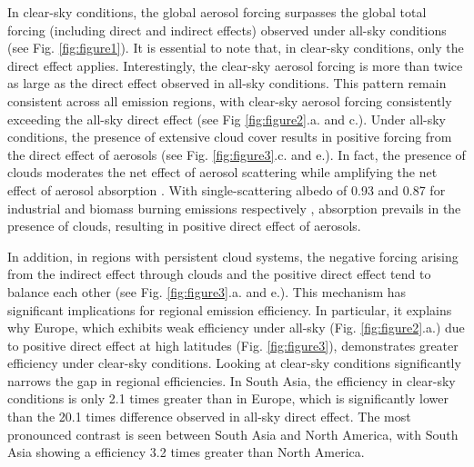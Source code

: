 \documentclass[draft]{agujournal2019}
\begin{document}
            In clear-sky conditions, the global aerosol forcing surpasses the global total forcing (including direct and indirect effects) observed under all-sky conditions (see Fig. \ref{fig:figure1}). It is essential to note that, in clear-sky conditions, only the direct effect applies. Interestingly, the clear-sky aerosol forcing is more than twice as large as the direct effect observed in all-sky conditions. This pattern remain consistent across all emission regions, with clear-sky aerosol forcing consistently exceeding the all-sky direct effect (see Fig \ref{fig:figure2}.a. and c.). 
            Under all-sky conditions, the presence of extensive cloud cover results in positive forcing from the direct effect of aerosols (see Fig. \ref{fig:figure3}.c. and e.). In fact, the presence of clouds moderates the net effect of aerosol scattering while amplifying the net effect of aerosol absorption \cite{Li_2022,Bellouin_2020}. With single-scattering albedo of 0.93 and 0.87 for industrial and biomass burning emissions respectively \cite{Stevens_2017}, absorption prevails in the presence of clouds, resulting in positive direct effect of aerosols. %
            
            In addition, in regions with persistent cloud systems, the negative forcing arising from the indirect effect through clouds and the positive direct effect tend to balance each other (see Fig. \ref{fig:figure3}.a. and e.).
            This mechanism has significant implications for regional emission efficiency. In particular, it explains why Europe, which exhibits weak efficiency under all-sky (Fig. \ref{fig:figure2}.a.) due to positive direct effect at high latitudes (Fig. \ref{fig:figure3}), demonstrates greater efficiency under clear-sky conditions. Looking at clear-sky conditions significantly narrows the gap in regional efficiencies. 
            In South Asia, the efficiency in clear-sky conditions is only 2.1 times greater than in Europe, which is significantly lower than the 20.1 times difference observed in all-sky direct effect. The most pronounced contrast is seen between South Asia and North America, with South Asia showing a efficiency 3.2 times greater than North America.
\end{document}
